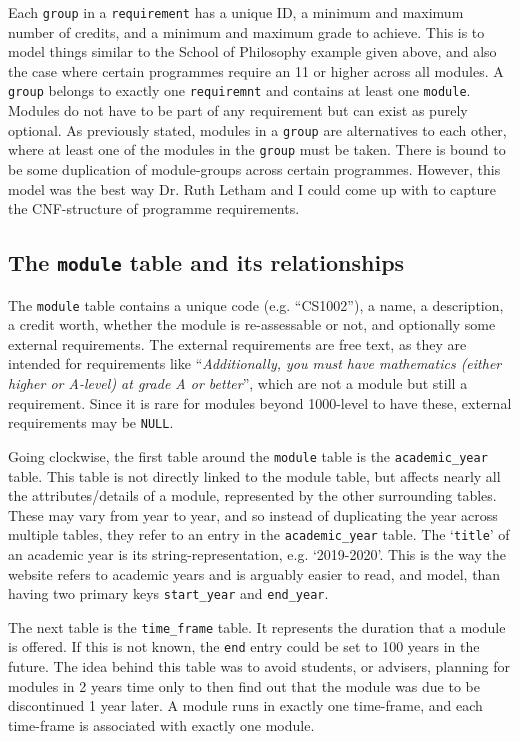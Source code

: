     Each \texttt{group} in a \texttt{requirement} has a unique ID, a minimum and
    maximum number of credits, and a minimum and maximum grade to achieve. This
    is to model things similar to the School of Philosophy example given above,
    and also the case where certain programmes require an 11 or higher across
    all modules. A \texttt{group} belongs to exactly one \texttt{requiremnt} and
    contains at least one \texttt{module}. Modules do not have to be part of any
    requirement but can exist as purely optional. As previously stated, modules
    in a \texttt{group} are alternatives to each other, where at least one of
    the modules in the \texttt{group} must be taken. There is bound to be some
    duplication of module-groups across certain programmes. However, this model
    was the best way Dr. Ruth Letham and I could come up with to capture the
    CNF-structure of programme requirements.
    
    \subsection{The \texttt{module} table and its relationships}
    The \texttt{module} table contains a unique code (e.g. ``CS1002''), a name,
    a description, a credit worth, whether the module is re-assessable or not,
    and optionally some external requirements. The external requirements are
    free text, as they are intended for requirements like
    ``\textit{Additionally, you must have mathematics (either higher or A-level)
    at grade A or better}'', which are not a module but still a requirement.
    Since it is rare for modules beyond 1000-level to have these, external
    requirements may be \texttt{NULL}.
    
    Going clockwise, the first table around the \texttt{module} table is the
    \texttt{academic\_year} table. This table is not directly linked to the
    module table, but affects nearly all the attributes/details of a module,
    represented by the other surrounding tables. These may vary from year to
    year, and so instead of duplicating the year across multiple tables, they
    refer to an entry in the \texttt{academic\_year} table. The `\texttt{title}'
    of an academic year is its string-representation, e.g. `2019-2020'. This is
    the way the website refers to academic years and is arguably easier to read,
    and model, than having two primary keys \texttt{start\_year} and
    \texttt{end\_year}.
    
    The next table is the \texttt{time\_frame} table. It represents the duration
    that a module is offered. If this is not known, the \texttt{end} entry could
    be set to 100 years in the future. The idea behind this table was to avoid
    students, or advisers, planning for modules in 2 years time only to then
    find out that the module was due to be discontinued 1 year later. A module
    runs in exactly one time-frame, and each time-frame is associated with
    exactly one module.
    \\
    
